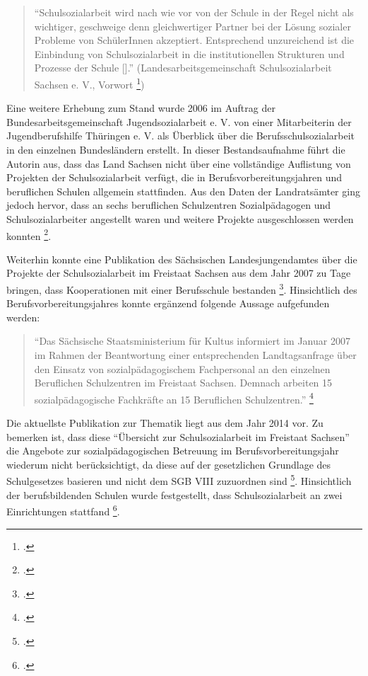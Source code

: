 \begin{quotation}
\noindent
	"`Schulsozialarbeit wird nach wie vor von der Schule in der Regel nicht als wichtiger, geschweige denn gleichwertiger Partner bei der Lösung sozialer Probleme von SchülerInnen akzeptiert. Entsprechend unzureichend ist die Einbindung von Schulsozialarbeit in die institutionellen Strukturen und Prozesse der Schule [\punkte]."' (Landesarbeitsgemeinschaft Schulsozialarbeit Sachsen e. V., Vorwort \footcite[vgl.]{LSS2004})
\end{quotation}

\noindent
Eine weitere Erhebung zum Stand wurde 2006 im Auftrag der Bundesarbeitsgemeinschaft Jugendsozialarbeit e. V. von einer Mitarbeiterin der Jugendberufshilfe Thüringen e. V. als Überblick über die Berufsschulsozialarbeit in den einzelnen Bundesländern erstellt. In dieser Bestandsaufnahme führt die Autorin aus, dass das Land Sachsen nicht über eine vollständige Auflistung von Projekten der Schulsozialarbeit verfügt, die in Berufsvorbereitungsjahren und beruflichen Schulen allgemein stattfinden. Aus den Daten der Land\-rats\-äm\-ter ging jedoch hervor, dass an sechs beruflichen Schulzentren Sozialpädagogen und Schulsozialarbeiter angestellt waren und weitere Projekte ausgeschlossen werden konnten \footcite[vgl.][28]{Lassmann2006}.

Weiterhin konnte eine Publikation des Sächsischen Landesjungendamtes über die Projekte der Schulsozialarbeit im Freistaat Sachsen aus dem Jahr 2007 zu Tage bringen, dass Kooperationen mit einer Berufsschule bestanden \footcite[vgl.][4]{SLFS2007}. Hinsichtlich des Berufsvorbereitungsjahres konnte ergänzend folgende Aussage aufgefunden werden: 

\begin{quotation}
\noindent
	"`Das Sächsische Staatsministerium für Kultus informiert im Januar 2007 im Rahmen der Beantwortung einer entsprechenden Landtagsanfrage über den Einsatz von sozialpädagogischem Fachpersonal an den einzelnen Beruflichen Schulzentren im Freistaat Sachsen. Demnach arbeiten 15 sozialpädagogische Fachkräfte an 15 Beruflichen Schulzentren."' \footcite[vgl.][13]{SLFS2007}
\end{quotation}

\noindent
Die aktuellste Publikation zur Thematik liegt aus dem Jahr 2014 vor. Zu bemerken ist, dass diese "`Übersicht zur Schulsozialarbeit im Freistaat Sachsen"' die Angebote zur sozialpädagogischen Betreuung im Berufsvorbereitungsjahr wiederum nicht berücksichtigt, da diese auf der gesetzlichen Grundlage des Schulgesetzes basieren und nicht dem SGB VIII zuzuordnen sind \footcite[vgl.][3]{SMSSSV2014}. Hinsichtlich der berufsbildenden Schulen wurde festgestellt, dass Schulsozialarbeit an zwei Einrichtungen stattfand \footcite[vgl.][5]{SMSSSV2014}. 


